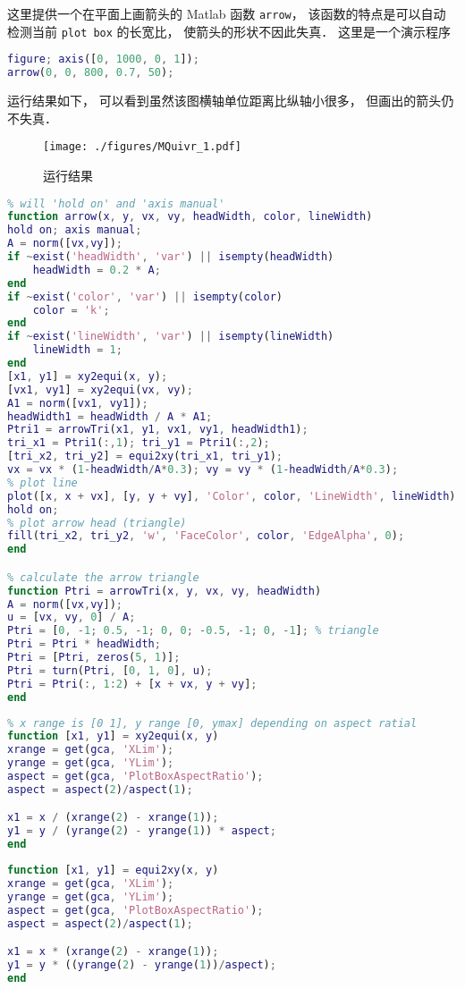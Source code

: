 

这里提供一个在平面上画箭头的 Matlab 函数 \verb|arrow|， 该函数的特点是可以自动检测当前 \verb|plot box| 的长宽比， 使箭头的形状不因此失真． 这里是一个演示程序
\begin{lstlisting}[language=matlab]
figure; axis([0, 1000, 0, 1]);
arrow(0, 0, 800, 0.7, 50);
\end{lstlisting}
运行结果如下， 可以看到虽然该图横轴单位距离比纵轴小很多， 但画出的箭头仍不失真．
\begin{figure}[ht]
\centering
\texttt{[image: ./figures/MQuivr\_1.pdf]}
\caption{运行结果} \label{MQuivr_fig1}
\end{figure}

\begin{lstlisting}[language=matlab, caption=arrow.m]
% plot arrow without distortion by getting current aspect ratio
% will 'hold on' and 'axis manual'
function arrow(x, y, vx, vy, headWidth, color, lineWidth)
hold on; axis manual;
A = norm([vx,vy]);
if ~exist('headWidth', 'var') || isempty(headWidth)
    headWidth = 0.2 * A;
end
if ~exist('color', 'var') || isempty(color)
    color = 'k';
end
if ~exist('lineWidth', 'var') || isempty(lineWidth)
    lineWidth = 1;
end
[x1, y1] = xy2equi(x, y);
[vx1, vy1] = xy2equi(vx, vy);
A1 = norm([vx1, vy1]);
headWidth1 = headWidth / A * A1;
Ptri1 = arrowTri(x1, y1, vx1, vy1, headWidth1);
tri_x1 = Ptri1(:,1); tri_y1 = Ptri1(:,2);
[tri_x2, tri_y2] = equi2xy(tri_x1, tri_y1);
vx = vx * (1-headWidth/A*0.3); vy = vy * (1-headWidth/A*0.3);
% plot line
plot([x, x + vx], [y, y + vy], 'Color', color, 'LineWidth', lineWidth);
hold on;
% plot arrow head (triangle)
fill(tri_x2, tri_y2, 'w', 'FaceColor', color, 'EdgeAlpha', 0);
end

% calculate the arrow triangle
function Ptri = arrowTri(x, y, vx, vy, headWidth)
A = norm([vx,vy]);
u = [vx, vy, 0] / A;
Ptri = [0, -1; 0.5, -1; 0, 0; -0.5, -1; 0, -1]; % triangle
Ptri = Ptri * headWidth;
Ptri = [Ptri, zeros(5, 1)];
Ptri = turn(Ptri, [0, 1, 0], u);
Ptri = Ptri(:, 1:2) + [x + vx, y + vy];
end
\end{lstlisting}

\begin{lstlisting}[language=matlab, caption=xy2equi.m]
% map x, y coordinates to x1, y1 with equal axis
% x range is [0 1], y range [0, ymax] depending on aspect ratial
function [x1, y1] = xy2equi(x, y)
xrange = get(gca, 'XLim');
yrange = get(gca, 'YLim');
aspect = get(gca, 'PlotBoxAspectRatio');
aspect = aspect(2)/aspect(1);

x1 = x / (xrange(2) - xrange(1));
y1 = y / (yrange(2) - yrange(1)) * aspect;
end
\end{lstlisting}

\begin{lstlisting}[language=matlab, caption=equi2xy.m]
% the inverse of function xy2equi
function [x1, y1] = equi2xy(x, y)
xrange = get(gca, 'XLim');
yrange = get(gca, 'YLim');
aspect = get(gca, 'PlotBoxAspectRatio');
aspect = aspect(2)/aspect(1);

x1 = x * (xrange(2) - xrange(1));
y1 = y * ((yrange(2) - yrange(1))/aspect);
end
\end{lstlisting}
